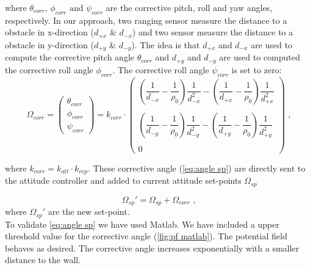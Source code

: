 where $\theta_{corr} \text{, } \phi_{corr} \text{ and } \psi_{corr}$ are the corrective pitch, roll and yaw angles, respectively. In our approach, two ranging sensor measure the distance to a obstacle in x-direction  ($d_{+x}$ \& $d_{-x}$) and two sensor measure the distance to a obstacle in y-direction ($d_{+y}$ \& $d_{-y}$). The idea is that $d_{+x}$ and $d_{-x}$ are used to compute the corrective pitch angle $\theta_{corr}$ and $d_{+y}$ and $d_{-y}$ are used to computed the corrective roll angle $\phi_{corr}$. The corrective roll angle $\psi_{corr}$ is set to zero:
\begin{equation}
	\label{eq:angle sp}
	\Omega_{corr} =
	\begin{pmatrix}
	\theta_{corr} \\ \phi_{corr} \\ \psi_{corr}
	\end{pmatrix} =
	k_{corr}\cdot 
	\begin{pmatrix}
	\left(\dfrac{1}{d_{-x}}-\dfrac{1}{\rho_0}\right)\dfrac{1}{d_{-x}^2}-\left(\dfrac{1}{d_{+x}}-\dfrac{1}{\rho_0}\right)\dfrac{1}{d_{+x}^2}\\\\
	\left(\dfrac{1}{d_{-y}}-\dfrac{1}{\rho_0}\right)\dfrac{1}{d_{-y}^2}-\left(\dfrac{1}{d_{+y}}-\dfrac{1}{\rho_0}\right)\dfrac{1}{d_{+y}^2} \\\\
	0
	\end{pmatrix}
	\text{ ,}
\end{equation}

where $k_{corr}=k_{att}\cdot k_{rep}$. These corrective angle (\cref{eq:angle sp}) are directly sent to the attitude controller and added to current attitude set-points $\Omega_{sp}$

\begin{equation}
\label{eq:new sp}
	\Omega_{sp}' = \Omega_{sp} + \Omega_{corr} \text{ ,}
\end{equation}
where $\Omega_{sp}'$ are the new set-point. \\
To validate \cref{eq:angle sp} we have used Matlab. We have included a upper threshold value for the corrective angle (\cref{fig:pf matlab}). The potential field behaves as desired. The corrective angle increases exponentially with a smaller distance to the wall. 

